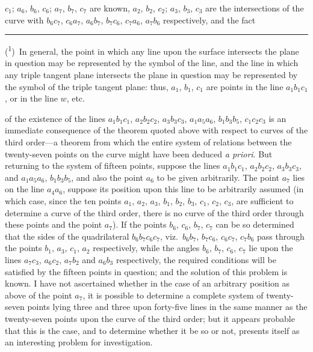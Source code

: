 \documentclass[12pt,a4paper]{article}
\begin{document}
$c_1$; $a_6$, $b_6$, $c_6$; $a_7$, $b_7$, $c_7$ are known, $a_2$, $b_2$, $c_2$; $a_3$, $b_3$, $c_3$ are the intersections of the curve with $b_6c_7$, $c_6a_7$, $a_6b_7$, $b_7c_6$, $c_7a_6$, $a_7b_6$ respectively, and the fact

\bigskip
\noindent\rule{0.3\textwidth}{0.4pt}

\noindent(\textsuperscript{1})~In general, the point in which any line upon the surface intersects the plane in question may be represented by the symbol of the line, and the line in which any triple tangent plane intersects the plane in question may be represented by the symbol of the triple tangent plane: thus, $a_1$, $b_1$, $c_1$ are points in the line $a_1b_1c_1$, or in the line $w$, etc.

\newpage

of the existence of the lines $a_1b_1c_1$, $a_2b_2c_2$, $a_3b_3c_3$, $a_1a_5a_6$, $b_1b_3b_5$, $c_1c_2c_3$ is an immediate consequence of the theorem quoted above with respect to curves of the third order---a theorem from which the entire system of relations between the twenty-seven points on the curve might have been deduced \textit{a priori}. But returning to the system of fifteen points, suppose the lines $a_1b_1c_1$, $a_2b_2c_2$, $a_3b_3c_3$, and $a_1a_5a_6$, $b_1b_3b_5$, and also the point $a_6$ to be given arbitrarily. The point $a_7$ lies on the line $a_4a_6$, suppose its position upon this line to be arbitrarily assumed (in which case, since the ten points $a_1$, $a_2$, $a_3$, $b_1$, $b_2$, $b_3$, $c_1$, $c_2$, $c_3$, are sufficient to determine a curve of the third order, there is no curve of the third order through these points and the point $a_7$). If the points $b_6$, $c_6$, $b_7$, $c_7$ can be so determined that the sides of the quadrilateral $b_6b_7c_6c_7$, viz.\ $b_6b_7$, $b_7c_6$, $c_6c_7$, $c_7b_6$ pass through the points $b_1$, $a_3$, $c_1$, $a_2$ respectively, while the angles $b_6$, $b_7$, $c_6$, $c_7$ lie upon the lines $a_7c_3$, $a_6c_2$, $a_7b_2$ and $a_6b_3$ respectively, the required conditions will be satisfied by the fifteen points in question; and the solution of this problem is known. I have not ascertained whether in the case of an arbitrary position as above of the point $a_7$, it is possible to determine a complete system of twenty-seven points lying three and three upon forty-five lines in the same manner as the twenty-seven points upon the curve of the third order; but it appears probable that this is the case, and to determine whether it be so or not, presents itself as an interesting problem for investigation.
\end{document}
